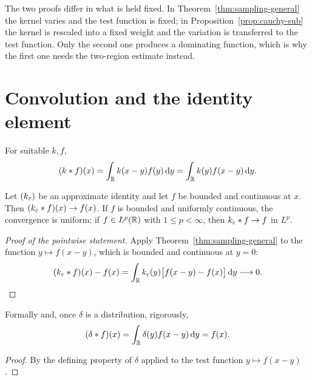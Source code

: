 The two proofs differ in what is held fixed. In Theorem~\ref{thm:sampling-general} the kernel varies
and the test function is fixed; in Proposition~\ref{prop:cauchy-sub} the kernel is rescaled into a
fixed weight and the variation is transferred to the test function. Only the second one produces a
dominating function, which is why the first one needs the two-region estimate instead.

\section{Convolution and the identity element}

\begin{definition}
For suitable $k,f$,
\begin{equation}
(k*f)(x)=\int_{\mathbb{R}}k(x-y)f(y)\,\mathrm{d} y=\int_{\mathbb{R}}k(y)f(x-y)\,\mathrm{d} y .
\end{equation}
\end{definition}

\begin{theorem}\label{thm:conv}
Let $(k_{\varepsilon})$ be an approximate identity and let $f$ be bounded and continuous at $x$. Then
$(k_{\varepsilon}*f)(x)\to f(x)$. If $f$ is bounded and uniformly continuous, the convergence is uniform;
if $f\in L^{p}(\mathbb{R})$ with $1\le p<\infty$, then $k_{\varepsilon}*f\to f$ in $L^{p}$.
\end{theorem}

\begin{proof}[Proof of the pointwise statement]
Apply Theorem~\ref{thm:sampling-general} to the function $y\mapsto f(x-y)$, which is bounded and
continuous at $y=0$:
\begin{equation}
(k_{\varepsilon}*f)(x)-f(x)=\int_{\mathbb{R}}k_{\varepsilon}(y)\big[f(x-y)-f(x)\big]\,\mathrm{d} y\longrightarrow0 . \qedhere
\end{equation}
\end{proof}

\begin{proposition}\label{prop:delta-identity}
Formally and, once $\delta$ is a distribution, rigorously,
\begin{equation}
(\delta*f)(x)=\int_{\mathbb{R}}\delta(y)f(x-y)\,\mathrm{d} y=f(x).
\end{equation}
\end{proposition}

\begin{proof}
By the defining property of $\delta$ applied to the test function $y\mapsto f(x-y)$.
\end{proof}

